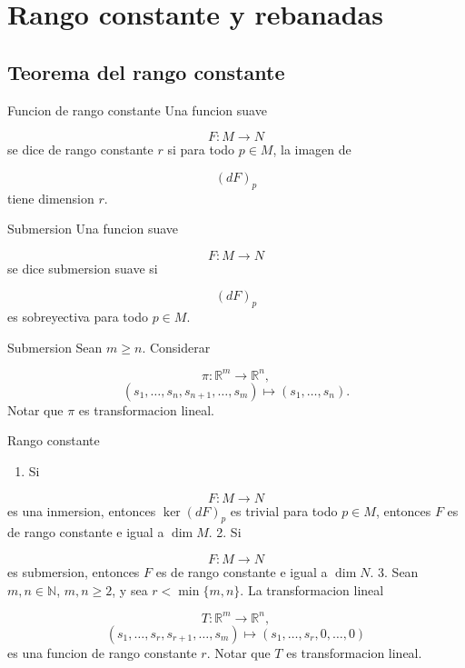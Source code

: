\chapter{Rango constante y rebanadas}
\label{ch:teo-12}
\section{Teorema del rango constante}
\begin{bookdefinition}{Funcion de rango constante}
Una funcion suave

\[
F:M\to N
\]
se dice de rango constante $r$ si para todo $p\in M$, la imagen de

\[
(dF)_p
\]
tiene dimension $r$.

\end{bookdefinition}
\begin{bookdefinition}{Submersion}
Una funcion suave

\[
F:M\to N
\]
se dice submersion suave si

\[
(dF)_p
\]
es sobreyectiva para todo $p\in M$.

\end{bookdefinition}
\begin{bookexample}{Submersion}
Sean $m\ge n$. Considerar

\[
\pi:\mathbb R^m\to \mathbb R^n,
\]
\[
(s_1,\ldots,s_n,s_{n+1},\ldots,s_m)\mapsto (s_1,\ldots,s_n).
\]
Notar que $\pi$ es transformacion lineal.

\end{bookexample}
\begin{bookexample}{Rango constante}
\begin{enumerate}
\item Si
\end{enumerate}
\[
F:M\to N
\]
es una inmersion, entonces $\ker(dF)_p$ es trivial para todo $p\in M$, entonces $F$ es de rango constante e igual a $\dim M$. 2. Si

\[
F:M\to N
\]
es submersion, entonces $F$ es de rango constante e igual a $\dim N$. 3. Sean $m,n\in\mathbb N$, $m,n\ge 2$, y sea $r<\min\{m,n\}$. La transformacion lineal

\[
T:\mathbb R^m\to \mathbb R^n,
\]
\[
(s_1,\ldots,s_r,s_{r+1},\ldots,s_m)\mapsto (s_1,\ldots,s_r,0,\ldots,0)
\]
es una funcion de rango constante $r$. Notar que $T$ es transformacion lineal.

\end{bookexample}
